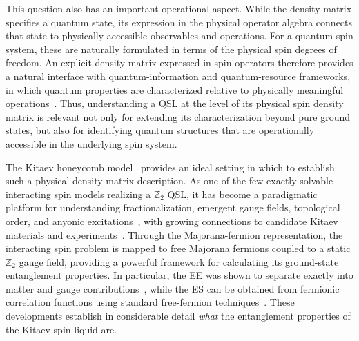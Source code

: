{This question also has an important operational aspect. While the density matrix specifies a quantum state, its expression in the physical operator algebra connects that state to physically accessible observables and operations. For a quantum spin system, these are naturally formulated in terms of the physical spin degrees of freedom. An explicit density matrix expressed in spin operators therefore provides a natural interface with quantum-information and quantum-resource frameworks, in which quantum properties are characterized relative to physically meaningful operations~\cite{Nielsen_Chuang_2010_sec8,Chitambar-Gour,Leone-Oliviero-Hamma_2022}. Thus, understanding a QSL at the level of its physical spin density matrix is relevant not only for extending its characterization beyond pure ground states, but also for identifying quantum structures that are operationally accessible in the underlying spin system.

The Kitaev honeycomb model~\cite{Kitaev_2006} provides an ideal setting in which to establish such a physical density-matrix description. As one of the few exactly solvable interacting spin models realizing a $\mathbb{Z}_2$ QSL, it has become a paradigmatic platform for understanding fractionalization, emergent gauge fields, topological order, and anyonic excitations~\cite{Savary-Balent_2017,Zhou-Kanoda-Ng_2017}, with growing connections to candidate Kitaev materials and experiments~\cite{Matsuda-Shibauchi-Kee_2025,Kasahara-etal_2018,Sandilands-Tian-Plumb-Kim-Burch_2015,Nasu-Knolle-Kovrizhin-Motome-Moessner_2016}. Through the Majorana-fermion representation, the interacting spin problem is mapped to free Majorana fermions coupled to a static $\mathbb{Z}_2$ gauge field, providing a powerful framework for calculating its ground-state entanglement properties. In particular, the EE was shown to separate exactly into matter and gauge contributions~\cite{Yao-Qi_2010}, while the ES can be obtained from fermionic correlation functions using standard free-fermion techniques~\cite{Jin-Korepin_2004,Vidal-Latorre-Rico-Kitaev_2003,Latorre-Rico-Vidal_2004,Peschel_2003,Peschel-Eisler_2009,Chung-Peschel_2001,Cheong-Henley_2004}. These developments establish in considerable detail \emph{what} the entanglement properties of the Kitaev spin liquid are.

}
